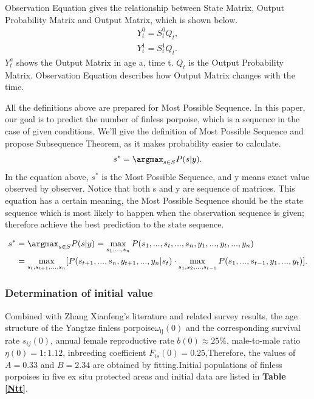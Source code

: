 \documentclass[12pt]{article}  %
\begin{document}
\begin{Definition}
Observation Equation gives the relationship between State Matrix, Output Probability Matrix and Output Matrix, which is shown below.
\begin{equation}
\begin{aligned}
Y^0_t = S^0_t Q_t, \\
Y^1_t = S^1_t Q_t. 
\end{aligned}
\end{equation}
$Y^a_{t}$ shows the Output Matrix in age a, time t. $Q_t$ is the Output Probability Matrix. Observation Equation describes how Output Matrix changes with the time.
\end{Definition}

\begin{Definition}
All the definitions above are prepared for Most Possible Sequence. In this paper, our goal is to predict the number of finless porpoise, which is a sequence in the case of given conditions. We'll give the definition of Most Possible Sequence and propose Subsequence Theorem, as it makes probability easier to calculate.
\begin{equation}
{{s}^{*}}=\argmax_{s \in S}P(s|y).
\end{equation}
In the equation above, $s^*$ is the Most Possible Sequence, and y means exact value observed by observer. Notice that both s and y are sequence of matrices. This equation has a certain meaning, the Most Possible Sequence should be the state sequence which is most likely to happen when the observation sequence is given; therefore achieve the best prediction to the state sequence.
\end{Definition}

\begin{Theorem}
\begin{equation}
\begin{aligned}
s^* &= \argmax_{s \in S}P(s|y) =  \max_{s_1,...,s_n}P(s_1,...,s_t,...,s_n,y_1,...,y_t,...,y_n)\\
&= \max_{s_t,s_{t+1},...,s_n}[P(s_{t+1},...,s_n,y_{t+1},...,y_n|s_t)\cdot \max_{s_1,s_2,...,s_{t-1}} P(s_1,...,s_{t-1},y_1,...,y_t)].
\end{aligned}
\end{equation}
\end{Theorem}

\subsubsection{Determination of initial value}
Combined with Zhang Xianfeng's literature and related survey results, the age structure of the Yangtze finless porpoise${{\omega }_{\text{ij}}}(0)$ and the corresponding survival rate ${{s}_ {ij}}(0)$, annual female reproductive rate $b(0)\approx 25\%$, male-to-male ratio $\eta (0)=1:1.12$, inbreeding coefficient ${{F}_{is} }(0)=0.25$,Therefore, the values of $A=0.33$ and $B=2.34$ are obtained by fitting.Initial populations of finless porpoises in five ex situ protected areas and initial data are listed in \textbf{Table \ref{Ntt}}. 
\end{document}
